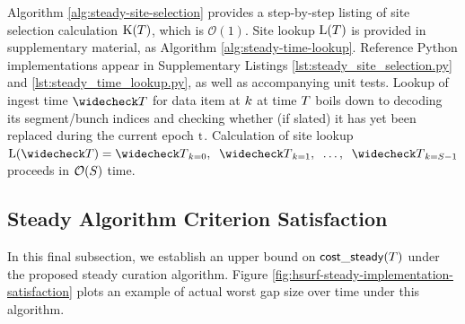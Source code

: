 

Algorithm \ref{alg:steady-site-selection} provides a step-by-step listing of site selection calculation $\colorK(\colorT)$, which is $\mathcal{O}(1)$.
Site lookup $\colorL(\colorT)$ is provided in supplementary material, as Algorithm \ref{alg:steady-time-lookup}.
Reference Python implementations appear in Supplementary Listings \ref{lst:steady_site_selection.py} and \ref{lst:steady_time_lookup.py}, as well as accompanying unit tests.
Lookup of ingest time $\colorTbar$ for data item at $\colork$ at time $\colorT$ boils down to decoding its segment/bunch indices and checking whether (if slated) it has yet been replaced during the current epoch $\colort$.
Calculation of site lookup $\colorL(\colorTbar) = \colorTbar_{\colork=0},\;\; \colorTbar_{\colork=1},\;\; \ldots,\;\; \colorTbar_{\colork=\colorS-1}$ proceeds in $\mathcal{O}(\colorS)$ time.

\subsection{Steady Algorithm Criterion Satisfaction}
\label{sec:steady-satisfaction}

In this final subsection, we establish an upper bound on $\mathsf{cost\_steady}(\colorT)$ under the proposed steady curation algorithm.
Figure \ref{fig:hsurf-steady-implementation-satisfaction} plots an example of actual worst gap size over time under this algorithm.


